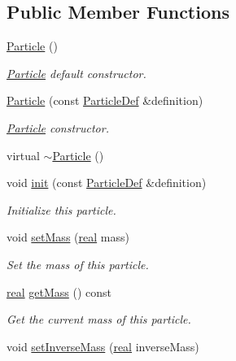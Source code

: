 \subsection*{Public Member Functions}
\begin{DoxyCompactItemize}
\item 
\mbox{\hyperlink{classr3_1_1_particle_a72d4ae82278e293bf0933a1aabbe9ac3}{Particle}} ()
\begin{DoxyCompactList}\small\item\em \mbox{\hyperlink{classr3_1_1_particle}{Particle}} default constructor. \end{DoxyCompactList}\item 
\mbox{\hyperlink{classr3_1_1_particle_a28a47b80f79433db842a47aca835003a}{Particle}} (const \mbox{\hyperlink{structr3_1_1_particle_def}{Particle\+Def}} \&definition)
\begin{DoxyCompactList}\small\item\em \mbox{\hyperlink{classr3_1_1_particle}{Particle}} constructor. \end{DoxyCompactList}\item 
virtual \mbox{\hyperlink{classr3_1_1_particle_a235fd8a567a6ec911f26ca49a8045460}{$\sim$\+Particle}} ()
\item 
void \mbox{\hyperlink{classr3_1_1_particle_a660673cfa03f0195560df72c659b22a5}{init}} (const \mbox{\hyperlink{structr3_1_1_particle_def}{Particle\+Def}} \&definition)
\begin{DoxyCompactList}\small\item\em Initialize this particle. \end{DoxyCompactList}\item 
void \mbox{\hyperlink{classr3_1_1_particle_a01f396041b3b54d674e227d56d600f6b}{set\+Mass}} (\mbox{\hyperlink{namespacer3_ab2016b3e3f743fb735afce242f0dc1eb}{real}} mass)
\begin{DoxyCompactList}\small\item\em Set the mass of this particle. \end{DoxyCompactList}\item 
\mbox{\hyperlink{namespacer3_ab2016b3e3f743fb735afce242f0dc1eb}{real}} \mbox{\hyperlink{classr3_1_1_particle_ade86b59933d1acc8d33f79a8735d8f3d}{get\+Mass}} () const
\begin{DoxyCompactList}\small\item\em Get the current mass of this particle. \end{DoxyCompactList}\item 
void \mbox{\hyperlink{classr3_1_1_particle_a6219cdcf36221881e92fbe548a682bed}{set\+Inverse\+Mass}} (\mbox{\hyperlink{namespacer3_ab2016b3e3f743fb735afce242f0dc1eb}{real}} inverse\+Mass)

\end{DoxyCompactItemize}
